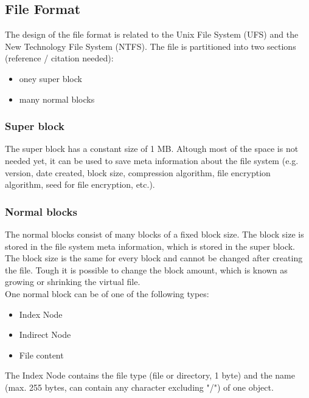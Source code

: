 \documentclass[a4paper,12pt]{article}
\begin{document}
\subsection{File Format}

The design of the file format is related to the Unix File System (UFS) and the New Technology File System (NTFS). The file is partitioned into two sections (reference / citation needed):

\begin{itemize}
  \item oney super block
  \item many normal blocks
\end{itemize}

\subsubsection{Super block}

The super block has a constant size of 1 MB. Altough most of the space is not needed yet, it can be used to save meta information about the file system (e.g. version, date created, block size, compression algorithm,
file encryption algorithm, seed for file encryption, etc.).

\subsubsection{Normal blocks}

The normal blocks consist of many blocks of a fixed block size. The block size is stored in the file system meta information, which is stored in the super block. The block size is the same for every block and cannot be changed after creating the file. Tough it is possible to change the block amount, which is known as growing or shrinking the virtual file.\\

One normal block can be of one of the following types:

\begin{itemize}
  \item Index Node
  \item Indirect Node
  \item File content
\end{itemize}


The Index Node contains the file type (file or directory, 1 byte) and the name (max. 255 bytes, can contain any character excluding "/") of one object.\\
\end{document}
